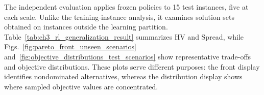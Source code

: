 The independent evaluation applies frozen policies to 15 test instances, five at each scale.
Unlike the training-instance analysis, it examines solution sets obtained on instances outside the learning partition.
Table~\ref{tab:ch3_rl_generalization_result} summarizes HV and Spread, while Figs.~\ref{fig:pareto_front_unseen_scenarios}
and~\ref{fig:objective_distributions_test_scenarios} show representative trade-offs and objective distributions.
These plots serve different purposes: the front display identifies nondominated alternatives,
whereas the distribution display shows where sampled objective values are concentrated.


